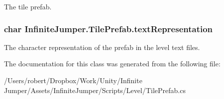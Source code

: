 The tile prefab. 

\hypertarget{class_infinite_jumper_1_1_tile_prefab_a88b18d3369e581a740d48e071c9f4790}{}
\subsubsection[{text\+Representation}]{\setlength{\rightskip}{0pt plus 5cm}char Infinite\+Jumper.\+Tile\+Prefab.\+text\+Representation}\label{class_infinite_jumper_1_1_tile_prefab_a88b18d3369e581a740d48e071c9f4790}


The character representation of the prefab in the level text files. 



The documentation for this class was generated from the following file\+:\begin{DoxyCompactItemize}
\item 
/\+Users/robert/\+Dropbox/\+Work/\+Unity/\+Infinite Jumper/\+Assets/\+Infinite\+Jumper/\+Scripts/\+Level/Tile\+Prefab.\+cs\end{DoxyCompactItemize}
